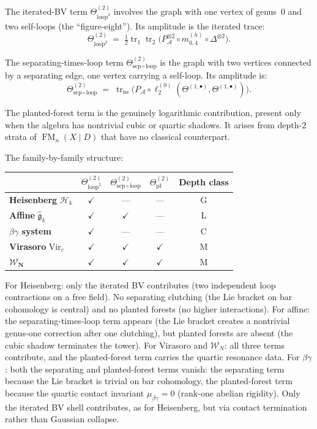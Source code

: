 \documentclass[11pt]{report}
\theoremstyle{definition}
\theoremstyle{remark}
\providecommand{\cA}{\mathcal{A}}
\providecommand{\cH}{\mathcal{H}}
\providecommand{\fg}{\mathfrak{g}}
\numberwithin{equation}{section}
\begin{document}
The iterated-BV term $\Theta^{(2)}_{\mathrm{loop}^2}$ involves the
graph with one vertex of genus~$0$ and two self-loops (the
``figure-eight''). Its amplitude is the iterated trace:
\[
\Theta^{(2)}_{\mathrm{loop}^2}
\;=\;
\tfrac{1}{2}\operatorname{tr}_1\operatorname{tr}_2
\bigl(P_\cA^{\otimes 2}\circ m^{(h)}_{0,4}\circ\Delta^{\otimes 2}\bigr).
\]

The separating-times-loop term
$\Theta^{(2)}_{\mathrm{sep}\circ\mathrm{loop}}$ is the graph with
two vertices connected by a separating edge, one vertex carrying a
self-loop. Its amplitude is:
\[
\Theta^{(2)}_{\mathrm{sep}\circ\mathrm{loop}}
\;=\;
\operatorname{tr}_{\mathrm{ns}}\bigl(
P_\cA\circ\ell_2^{(0)}(\Theta^{(1,\bullet)},\Theta^{(1,\bullet)})
\bigr).
\]

The planted-forest term is the genuinely logarithmic contribution,
present only when the algebra has nontrivial cubic or quartic
shadows. It arises from depth-$2$ strata of
$\operatorname{FM}_n(X\mathbin{|}D)$ that have no classical
counterpart.

\medskip

\noindent
The family-by-family structure:

\begin{center}
\renewcommand{\arraystretch}{1.2}
\begin{tabular}{lcccc}
& $\Theta^{(2)}_{\mathrm{loop}^2}$
& $\Theta^{(2)}_{\mathrm{sep}\circ\mathrm{loop}}$
& $\Theta^{(2)}_{\mathrm{pf}}$
& \textbf{Depth class}\\
\hline
\textbf{Heisenberg} $\cH_k$
 & $\checkmark$ & --- & --- & G\\
\textbf{Affine} $\widehat{\fg}_k$
 & $\checkmark$ & $\checkmark$ & --- & L\\
\textbf{$\beta\gamma$ system}
 & $\checkmark$ & --- & --- & C\\
\textbf{Virasoro} $\mathrm{Vir}_c$
 & $\checkmark$ & $\checkmark$ & $\checkmark$ & M\\
$\boldsymbol{\mathcal W_N}$
 & $\checkmark$ & $\checkmark$ & $\checkmark$ & M
\end{tabular}
\end{center}

For Heisenberg: only the iterated BV contributes (two independent
loop contractions on a free field). No separating clutching (the Lie
bracket on bar cohomology is central) and no planted forests (no
higher interactions). For affine: the separating-times-loop term
appears (the Lie bracket creates a nontrivial genus-one correction
after one clutching), but planted forests are absent (the cubic
shadow terminates the tower). For Virasoro and $\mathcal W_N$: all
three terms contribute, and the planted-forest term carries the
quartic resonance data. For $\beta\gamma$: both the separating and planted-forest terms
vanish: the separating term because the Lie bracket is trivial on
bar cohomology, the planted-forest term because the quartic contact
invariant $\mu_{\beta\gamma}=0$ (rank-one abelian rigidity). Only
the iterated BV shell contributes, as for Heisenberg, but via
contact termination rather than Gaussian collapse.
\end{document}
